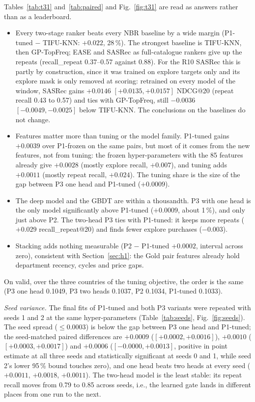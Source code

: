 \documentclass{ieeeaccess}
\begin{document}
Tables~\ref{tab:t31} and~\ref{tab:paired} and Fig.~\ref{fig:t31} are read as answers rather than as a leaderboard.
\begin{itemize}
\item Every two-stage ranker beats every NBR baseline by a wide margin (P1-tuned $-$ TIFU-KNN: $+0.022$, 28\,\%). The strongest baseline
is TIFU-KNN, then GP-TopFreq; EASE and SASRec as full-catalogue rankers give up the repeats (recall\_repeat 0.37--0.57 against
0.88). For the R10 SASRec this is partly by construction, since it was trained on explore targets only and its explore mask is only
removed at scoring: retrained on every model of the window, SASRec gains $+0.0146$ $[+0.0135, +0.0157]$ NDCG@20 (repeat recall 0.43
to 0.57) and ties with GP-TopFreq, still $-0.0036$ $[-0.0049, -0.0025]$ below TIFU-KNN. The conclusions on the baselines do not change.
\item Features matter more than tuning or the model family. P1-tuned gains $+0.0039$ over P1-frozen on the same pairs, but most of
it comes from the new features, not from tuning: the frozen hyper-parameters with the 85 features already give $+0.0028$ (mostly
explore recall, $+0.007$), and tuning adds $+0.0011$ (mostly repeat recall, $+0.024$). The tuning share is the size of the gap
between P3 one head and P1-tuned ($+0.0009$).
\item The deep model and the GBDT are within a thousandth. P3 with one head is the only model significantly above P1-tuned ($+0.0009$,
about 1\,\%), and only just above P2. The two-head P3 ties with P1-tuned: it keeps more repeats ($+0.029$ recall\_repeat@20) and finds
fewer explore purchases ($-0.003$).
\item Stacking adds nothing measurable (P2 $-$ P1-tuned $+0.0002$, interval across zero), consistent with Section~\ref{sec:h1}: the Gold
pair features already hold department recency, cycles and price gaps.
\end{itemize}
On valid, over the three countries of the tuning objective, the order is the same (P3 one head 0.1049, P3 two heads 0.1037, P2
0.1034, P1-tuned 0.1033).

\textit{Seed variance.} The final fits of P1-tuned and both P3 variants were repeated with seeds 1 and 2 at the same hyper-parameters
(Table~\ref{tab:seeds}, Fig.~\ref{fig:seeds}). The seed spread ($\le 0.0003$) is below the gap between P3 one head and P1-tuned; the
seed-matched paired differences are $+0.0009$ ($[+0.0002, +0.0016]$), $+0.0010$ ($[+0.0003, +0.0017]$) and $+0.0006$ ($[-0.0000, +0.0013]$, positive in point estimate at all three seeds and statistically significant at seeds 0 and 1, while seed 2's lower 95\,\% bound touches zero), and one head beats two heads at every seed ($+0.0011$,
$+0.0018$, $+0.0011$). The two-head model is the least stable: its repeat recall moves from 0.79 to 0.85 across seeds, i.e., the
learned gate lands in different places from one run to the next.
\end{document}
